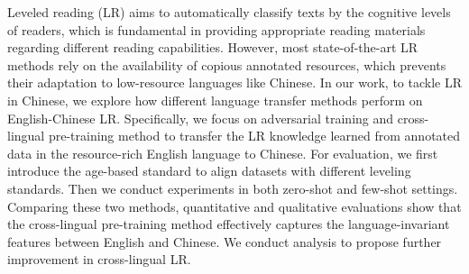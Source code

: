 Leveled reading (LR) aims to automatically classify texts by the cognitive levels of readers, which is fundamental in providing appropriate reading materials regarding different reading capabilities. However, most state-of-the-art LR methods rely on the availability of copious annotated resources, which prevents their adaptation to low-resource languages like Chinese. In our work, to tackle LR in Chinese, we explore how different language transfer methods perform on English-Chinese LR. Specifically, we focus on adversarial training and cross-lingual pre-training method to transfer the LR knowledge learned from annotated data in the resource-rich English language to Chinese. For evaluation, we first introduce the age-based standard to align datasets with different leveling standards. Then we conduct  experiments in both zero-shot and few-shot settings. Comparing these two methods, quantitative and qualitative evaluations show that the cross-lingual pre-training method effectively captures the language-invariant features between English and Chinese. We conduct analysis to propose further improvement in cross-lingual LR.
